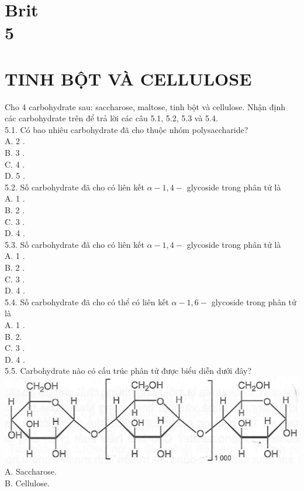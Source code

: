 \documentclass[10pt]{article}
\begin{document}
\section*{Brit \\
 5}
\section*{TINH BỘT VÀ CELLULOSE}
Cho 4 carbohydrate sau: saccharose, maltose, tinh bột và cellulose. Nhận định các carbohydrate trên để trả lời các câu 5.1, 5.2, 5.3 và 5.4.\\
5.1. Có bao nhiêu carbohydrate đã cho thuộc nhóm polysaccharide?\\
A. 2 .\\
B. 3 .\\
C. 4 .\\
D. 5 .\\
5.2. Số carbohydrate đã cho có liên kết $\alpha-1,4-$ glycoside trong phân tử là\\
A. 1 .\\
B. 2 .\\
C. 3 .\\
D. 4 .\\
5.3. Số carbohydrate đã cho có liên kết $\alpha-1,4-$ glycoside trong phân tử là\\
A. 1 .\\
B. 2 .\\
C. 3 .\\
D. 4 .\\
5.4. Số carbohydrate đã cho có thể có liên kết $\alpha-1,6-$ glycoside trong phân tử là\\
A. 1 .\\
B. 2.\\
C. 3 .\\
D. 4 .\\
5.5. Carbohydrate nào có cấu trúc phân tử được biểu diễn dưới đây?\\
\includegraphics[max width=\textwidth, center]{2025_10_23_de6f5713836e4e91b3c8g-030}\\
A. Saccharose.\\
B. Cellulose.\\
\end{document}
